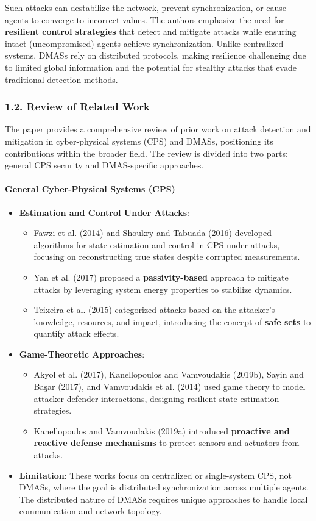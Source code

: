 \documentclass{article}
\begin{document}
Such attacks can destabilize the network, prevent synchronization, or cause agents to converge to incorrect values. The authors emphasize the need for \textbf{resilient control strategies} that detect and mitigate attacks while ensuring intact (uncompromised) agents achieve synchronization. Unlike centralized systems, DMASs rely on distributed protocols, making resilience challenging due to limited global information and the potential for stealthy attacks that evade traditional detection methods.

\subsubsection*{1.2. Review of Related Work}
The paper provides a comprehensive review of prior work on attack detection and mitigation in cyber-physical systems (CPS) and DMASs, positioning its contributions within the broader field. The review is divided into two parts: general CPS security and DMAS-specific approaches.

\paragraph*{General Cyber-Physical Systems (CPS)}
\begin{itemize}
    \item \textbf{Estimation and Control Under Attacks}:
    \begin{itemize}
        \item Fawzi et al. (2014) and Shoukry and Tabuada (2016) developed algorithms for state estimation and control in CPS under attacks, focusing on reconstructing true states despite corrupted measurements.
        \item Yan et al. (2017) proposed a \textbf{passivity-based} approach to mitigate attacks by leveraging system energy properties to stabilize dynamics.
        \item Teixeira et al. (2015) categorized attacks based on the attacker’s knowledge, resources, and impact, introducing the concept of \textbf{safe sets} to quantify attack effects.
    \end{itemize}
    \item \textbf{Game-Theoretic Approaches}:
    \begin{itemize}
        \item Akyol et al. (2017), Kanellopoulos and Vamvoudakis (2019b), Sayin and Başar (2017), and Vamvoudakis et al. (2014) used game theory to model attacker-defender interactions, designing resilient state estimation strategies.
        \item Kanellopoulos and Vamvoudakis (2019a) introduced \textbf{proactive and reactive defense mechanisms} to protect sensors and actuators from attacks.
    \end{itemize}
    \item \textbf{Limitation}: These works focus on centralized or single-system CPS, not DMASs, where the goal is distributed synchronization across multiple agents. The distributed nature of DMASs requires unique approaches to handle local communication and network topology.
\end{itemize}
\end{document}
